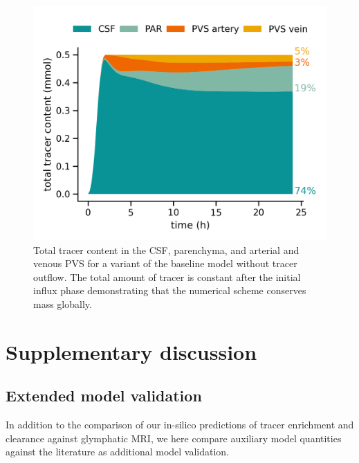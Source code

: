 \documentclass[fleqn,10pt]{wlscirep}
\begin{document}
\begin{figure}
    \centering
    \includegraphics[width=0.5\linewidth]{figures/modelAMassConservation_total_conc.png}
    \caption{Total tracer content in the CSF, parenchyma, and arterial and venous PVS for a variant of the baseline model without tracer outflow. The total amount of tracer is constant after the initial influx phase demonstrating that the numerical scheme conserves mass globally.}
    \label{fig:mass_conservation}
\end{figure}

\section{Supplementary discussion}

\subsection{Extended model validation}
\label{sec:app:model_validation}

In addition to the comparison of our in-silico predictions of tracer
enrichment and clearance against glymphatic MRI, we here compare
auxiliary model quantities against the literature as additional model
validation.
\end{document}
